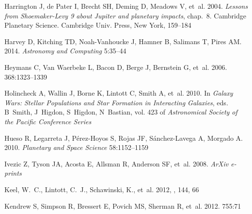 \documentclass{ar2e}
\begin{document}
\begin{thebibliography}{}
{Harrington} J, {de Pater} I, {Brecht} SH, {Deming} D, {Meadows} V, et~al.
  2004.
\newblock \textit{{Lessons from Shoemaker-Levy 9 about Jupiter and planetary
  impacts}}, chap.~8.
\newblock Cambridge Planetary Science. Cambridge Univ. Press, New York,
  159--184

{Harvey} D, {Kitching} TD, {Noah-Vanhoucke} J, {Hamner} B, {Salimans} T,
  {Pires} AM. 2014.
\newblock \textit{Astronomy and Computing} 5:35--44

{Heymans} C, {Van Waerbeke} L, {Bacon} D, {Berge} J, {Bernstein} G, et~al.
  2006.
\newblock \textit{\mnras} 368:1323--1339

{Holincheck} A, {Wallin} J, {Borne} K, {Lintott} C, {Smith} A, et~al. 2010.
\newblock In \textit{Galaxy Wars: Stellar Populations and Star Formation in
  Interacting Galaxies}, eds. B~{Smith}, J~{Higdon}, S~{Higdon}, N~{Bastian},
  vol. 423 of \textit{Astronomical Society of the Pacific Conference Series}

{Hueso} R, {Legarreta} J, {P{\'e}rez-Hoyos} S, {Rojas} JF, {S{\'a}nchez-Lavega}
  A, {Morgado} A. 2010.
\newblock \textit{Planetary and Space Science} 58:1152--1159

{Ivezic} Z, {Tyson} JA, {Acosta} E, {Allsman} R, {Anderson} SF, et~al. 2008.
\newblock \textit{ArXiv e-prints}

{Keel}, W.~C., {Lintott}, C.~J., {Schawinski}, K., {et~al.} 2012, \aj, 144, 66

{Kendrew} S, {Simpson} R, {Bressert} E, {Povich} MS, {Sherman} R, et~al. 2012.
\newblock \textit{\apj} 755:71


\end{thebibliography}
\end{document}

